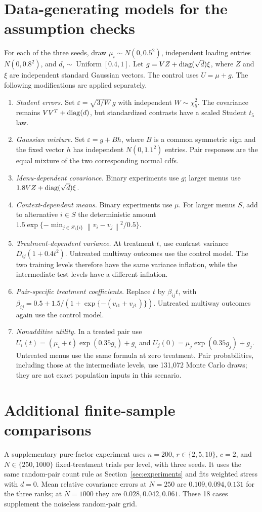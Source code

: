 \documentclass[11pt]{amsart}
\theoremstyle{definition}\newtheorem{example}[theorem]{Example}
\theoremstyle{remark}\newtheorem{remark}[theorem]{Remark}
\newcommand{\norm}[1]{\left\lVert#1\right\rVert}
\begin{document}
\section{Data-generating models for the assumption checks}\label{app:misspec}
For each of the three seeds, draw $\mu_i\sim N(0,0.5^2)$, independent loading entries $N(0,0.8^2)$, and $d_i\sim\operatorname{Uniform}[0.4,1]$. Let $g=VZ+\operatorname{diag}(\sqrt d)\xi$, where $Z$ and $\xi$ are independent standard Gaussian vectors. The control uses $U=\mu+g$. The following modifications are applied separately.
\begin{enumerate}
\item \emph{Student errors.} Set $\varepsilon=\sqrt{3/W}\,g$ with independent $W\sim\chi^2_5$. The covariance remains $VV^T+\operatorname{diag}(d)$, but standardized contrasts have a scaled Student $t_5$ law.
\item \emph{Gaussian mixture.} Set $\varepsilon=g+B h$, where $B$ is a common symmetric sign and the fixed vector $h$ has independent $N(0,1.1^2)$ entries. Pair responses are the equal mixture of the two corresponding normal cdfs.
\item \emph{Menu-dependent covariance.} Binary experiments use $g$; larger menus use $1.8VZ+\operatorname{diag}(\sqrt d)\xi$.
\item \emph{Context-dependent means.} Binary experiments use $\mu$. For larger menus $S$, add to alternative $i\in S$ the deterministic amount $1.5\exp\{-\min_{j\in S\setminus\{i\}}\norm{v_i-v_j}^2/0.5\}$.
\item \emph{Treatment-dependent variance.} At treatment $t$, use contrast variance $D_{ij}(1+0.4t^2)$. Untreated multiway outcomes use the control model. The two training levels therefore have the same variance inflation, while the intermediate test levels have a different inflation.
\item \emph{Pair-specific treatment coefficients.} Replace $t$ by $\beta_{ij}t$, with $\beta_{ij}=0.5+1.5/(1+\exp\{-(v_{i1}+v_{j1})\})$. Untreated multiway outcomes again use the control model.
\item \emph{Nonadditive utility.} In a treated pair use $U_i(t)=(\mu_i+t)\exp(0.35g_i)+g_i$ and $U_j(0)=\mu_j\exp(0.35g_j)+g_j$. Untreated menus use the same formula at zero treatment. Pair probabilities, including those at the intermediate levels, use 131,072 Monte Carlo draws; they are not exact population inputs in this scenario.
\end{enumerate}

\section{Additional finite-sample comparisons}\label{app:supplement}
A supplementary pure-factor experiment uses $n=200$, $r\in\{2,5,10\}$, $c=2$, and $N\in\{250,1000\}$ fixed-treatment trials per level, with three seeds. It uses the same random-pair count rule as Section~\ref{sec:experiments} and fits weighted stress with $d=0$. Mean relative covariance errors at $N=250$ are $0.109,0.094,0.131$ for the three ranks; at $N=1000$ they are $0.028,0.042,0.061$. These 18 cases supplement the noiseless random-pair grid.
\end{document}
